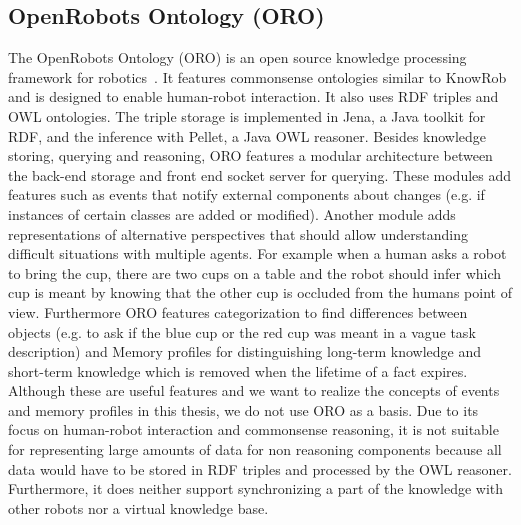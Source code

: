 \documentclass[a4paper,11pt]{article}
\begin{document}
\subsection{OpenRobots Ontology (ORO)}
\label{sec:oro}
The OpenRobots Ontology (ORO) is an open source knowledge processing
framework for robotics~\cite{Oro}. It features commonsense ontologies
similar to KnowRob and is designed to enable human-robot
interaction. It also uses RDF triples and OWL ontologies. The triple
storage is implemented in Jena, a Java toolkit for RDF, and the
inference with Pellet, a Java OWL reasoner. Besides knowledge storing,
querying and reasoning, ORO features a modular architecture between
the back-end storage and front end socket server for querying. These
modules add features such as events that notify external components
about changes (e.g. if instances of certain classes are added or
modified). Another module adds representations of alternative
perspectives that should allow understanding difficult situations with
multiple agents. For example when a human asks a robot to bring the
cup, there are two cups on a table and the robot should infer which
cup is meant by knowing that the other cup is occluded from the humans
point of view. Furthermore ORO features categorization to find
differences between objects (e.g. to ask if the blue cup or the red
cup was meant in a vague task description) and Memory profiles for
distinguishing long-term knowledge and short-term knowledge which is
removed when the lifetime of a fact expires. Although these are useful
features and we want to realize the concepts of events and memory
profiles in this thesis, we do not use ORO as a basis. Due to its
focus on human-robot interaction and commonsense reasoning, it is not
suitable for representing large amounts of data for non reasoning
components because all data would have to be stored in RDF triples and
processed by the OWL reasoner. Furthermore, it does neither support
synchronizing a part of the knowledge with other robots nor a virtual
knowledge base.
\end{document}
